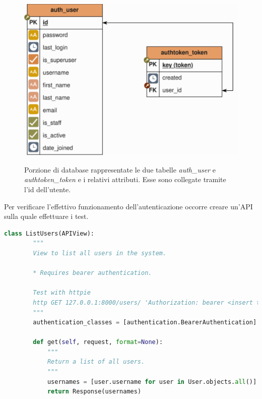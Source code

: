 \documentclass[./main.tex]{subfiles}
\begin{document}
\begin{figure}[!ht]
\noindent\begin{minipage}{0.6\textwidth}
\vspace{1cm}
\includegraphics[width=\textwidth]{images/db_token_user_auth.pdf}
\captionsetup{font=small, hypcap=false}
\label{fig:auth_user_token}
\end{minipage}
\hspace{0.05\textwidth}
\begin{minipage}{0.3\textwidth}
\begin{small}
Porzione di database rappresentate le due tabelle \textit{auth\_user} e \textit{authtoken\_token} e i relativi attributi. Esse sono collegate tramite l'id dell'utente.
\end{small}
\end{minipage}
\vspace{0.25cm}
\end{figure}
Per verificare l'effettivo funzionamento dell'autenticazione occorre creare un'API sulla quale effettuare i test. 

\begin{lstlisting}[language=Python, caption=api.py, label=lst:api]
    class ListUsers(APIView):
        """
        View to list all users in the system.
    
        * Requires bearer authentication.
        
        Test with httpie 
        http GET 127.0.0.1:8000/users/ 'Authorization: bearer <insert token here>'
        """
        authentication_classes = [authentication.BearerAuthentication]
    
        def get(self, request, format=None):
            """
            Return a list of all users.
            """
            usernames = [user.username for user in User.objects.all()]
            return Response(usernames)
\end{lstlisting}
\end{document}
